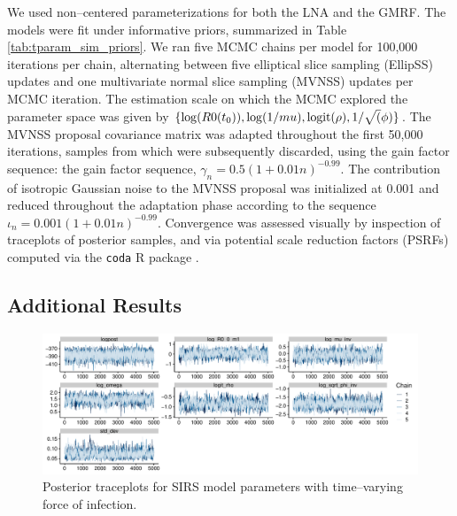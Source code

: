 We used non--centered parameterizations for both the LNA and the GMRF. The models were fit under informative priors, summarized in Table \ref{tab:tparam_sim_priors}. We ran five MCMC chains per model for 100,000 iterations per chain, alternating between five elliptical slice sampling (EllipSS) updates and one multivariate normal slice sampling (MVNSS) updates per MCMC iteration. The estimation scale on which the MCMC explored the parameter space was given by $\lbrace \log(R0(t_0)), \log(1/mu), \mathrm{logit}(\rho), 1/\sqrt(\phi) \rbrace$. The MVNSS proposal covariance matrix was adapted throughout the first 50,000 iterations, samples from which were subsequently discarded, using the gain factor sequence: the gain factor sequence, $\gamma_n = 0.5(1 + 0.01n)^{-0.99}$. The contribution of isotropic Gaussian noise to the MVNSS proposal was initialized at 0.001 and reduced throughout the adaptation phase according to the sequence $ \iota_n = 0.001(1 + 0.01n)^{-0.99} $. Convergence was assessed visually by inspection of traceplots of posterior samples, and via potential scale reduction factors (PSRFs) \cite{brooks1998general} computed via the \texttt{coda} R package \cite{codapackage}.

\newpage
\subsection{Additional Results}
\label{subsec:sinfoi_supp_res}

\begin{figure}[htbp]
	\centering
	\includegraphics[width=\linewidth]{figures/sinfoi_rw1_traces}
	\caption{Posterior traceplots for SIRS model parameters with time--varying force of infection.}
	\label{fig:sinfoirw1traces}
\end{figure}

